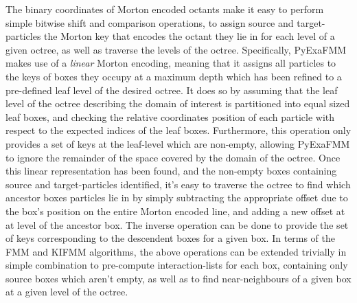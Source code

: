 The binary coordinates of Morton encoded octants make it easy to perform simple
bitwise shift and comparison operations, to assign source and \gls{target-particles} the Morton key
that encodes the octant they lie in for each level of a given octree, as well as traverse the levels of
the octree. Specifically, \gls{PyExaFMM} makes use of a \textit{linear} Morton encoding, meaning that it assigns
all particles to the keys of boxes they occupy at a maximum depth which has been refined to a
pre-defined leaf level of the desired octree. It does so by assuming that the
leaf level of the octree describing the domain of interest is partitioned into equal
sized leaf boxes, and checking the relative coordinates position of each particle
with respect to the expected indices of the leaf boxes. Furthermore, this operation only provides
a set of keys at the leaf-level which are non-empty, allowing \gls{PyExaFMM} to
ignore the remainder of the space covered by the domain of the octree. Once this
linear representation has been found, and the non-empty boxes containing
source and \gls{target-particles} identified, it's easy to traverse the octree
to find which ancestor boxes particles lie in by simply subtracting the appropriate
offset due to the box's position on the entire Morton encoded line, and adding a new offset at
at level of the ancestor box. The inverse operation can be done to provide the set
of keys corresponding to the descendent boxes for a given box. In terms of the
\gls{FMM} and \gls{KIFMM} algorithms, the above operations can be extended trivially
in simple combination to pre-compute \gls{interaction-list}s for each box, containing
only source boxes which aren't empty, as well as to find \gls{near-neighbours} of
a given box at a given level of the octree.

